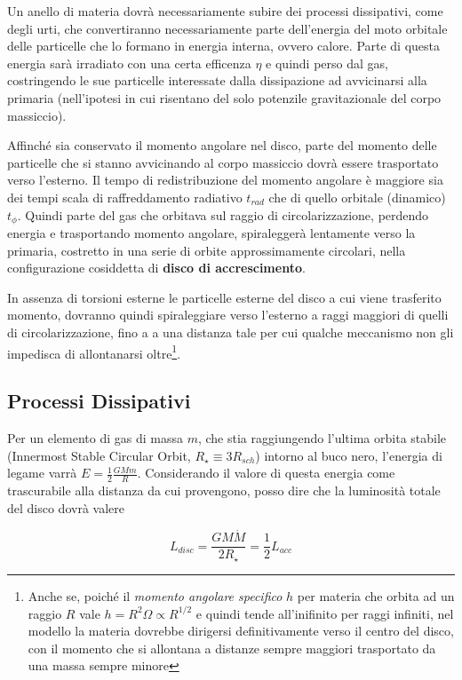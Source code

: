 \documentclass[a4paperbi]{article}
\begin{document}
	Un anello di materia dovrà necessariamente subire dei processi dissipativi, come degli urti, che convertiranno necessariamente parte dell'energia del moto orbitale delle particelle che lo formano in energia interna, ovvero calore. Parte di questa energia sarà irradiato con una certa efficenza $\eta$ e quindi perso dal gas, costringendo le sue particelle interessate dalla dissipazione ad avvicinarsi alla primaria (nell'ipotesi in cui risentano del solo potenzile gravitazionale del corpo massiccio). 
	
	Affinché sia conservato il momento angolare nel disco, parte del momento delle particelle che si stanno avvicinando al corpo massiccio dovrà essere trasportato verso l'esterno. Il tempo di redistribuzione del momento angolare è maggiore sia dei tempi scala di raffreddamento radiativo $t_{rad}$ che di quello orbitale (dinamico) $t_{\phi}$. Quindi parte del gas che orbitava sul raggio di circolarizzazione, perdendo energia e trasportando momento angolare, spiraleggerà lentamente verso la primaria, costretto in una serie di orbite approssimamente circolari, nella configurazione cosiddetta di \textbf{disco di accrescimento}. 	
	
	In assenza di torsioni esterne le particelle esterne del disco a cui viene trasferito momento, dovranno quindi spiraleggiare verso l'esterno a raggi maggiori di quelli di circolarizzazione, fino a a una distanza tale per cui qualche meccanismo non gli impedisca di allontanarsi oltre\footnote{Anche se, poiché il \textit{momento angolare specifico} $h$ per materia che orbita ad un raggio $R$ vale $h=R^2\Omega\propto R^{1/2}$ e quindi tende all'inifinito per raggi infiniti, nel modello la materia dovrebbe dirigersi definitivamente verso il centro del disco, con il momento che si allontana a distanze sempre maggiori trasportato da una massa sempre minore}.
		
\subsection{Processi Dissipativi}
	Per un elemento di gas di massa $m$, che stia raggiungendo l'ultima orbita stabile (Innermost Stable Circular Orbit,  $R_{\star}\equiv 3R_{sch}$) intorno al buco nero, l'energia di legame varrà $E=\frac{1}{2}\frac{GMm}{R}$. Considerando il valore di questa energia come trascurabile alla distanza da cui provengono, posso dire che la luminosità totale del disco dovrà valere
	
	\begin{equation}
		L_{disc}=\frac{GM\dot{M}}{2R_{\star}}=\frac{1}{2}L_{acc}
	\end{equation}
\end{document}
